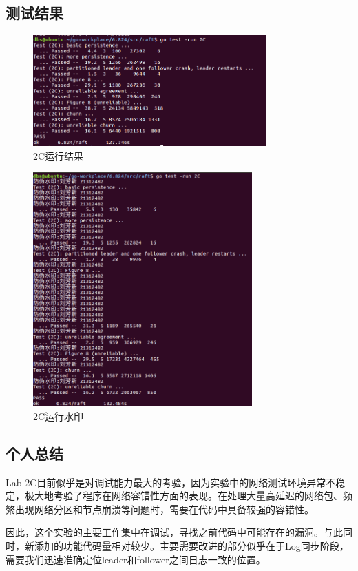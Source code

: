\documentclass[]{article}
\begin{document}
	\subsection{测试结果}
	\begin{figure}[H]
		\centering
		\includegraphics[width=0.8\textwidth]{./2C/2C result.png}
		\caption{2C运行结果}
	\end{figure}
	\begin{figure}[H]
		\centering
		\includegraphics[width=0.75\textwidth]{./2C/2C result1.png}
		\caption{2C运行水印}
	\end{figure}
	\subsection{个人总结}
	Lab 2C目前似乎是对调试能力最大的考验，因为实验中的网络测试环境异常不稳定，极大地考验了程序在网络容错性方面的表现。在处理大量高延迟的网络包、频繁出现网络分区和节点崩溃等问题时，需要在代码中具备较强的容错性。
	
	因此，这个实验的主要工作集中在调试，寻找之前代码中可能存在的漏洞。与此同时，新添加的功能代码量相对较少。主要需要改进的部分似乎在于Log同步阶段，需要我们迅速准确定位leader和follower之间日志一致的位置。
	
\end{document}
